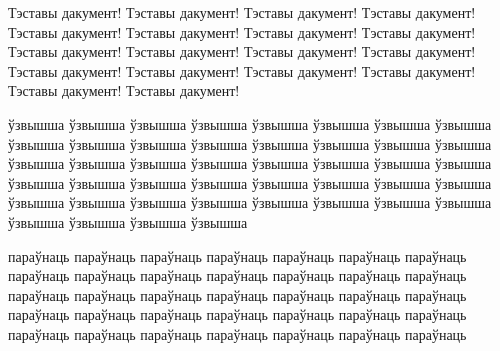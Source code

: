 \documentclass[a4paper]{article}
\begin{document}
Тэставы дакумент! Тэставы дакумент! Тэставы дакумент! Тэставы дакумент! Тэставы дакумент! Тэставы дакумент! Тэставы дакумент! Тэставы дакумент! Тэставы дакумент! Тэставы дакумент! Тэставы дакумент! Тэставы дакумент! Тэставы дакумент! Тэставы дакумент! Тэставы дакумент! Тэставы дакумент! Тэставы дакумент! Тэставы дакумент!

ўзвышша ўзвышша ўзвышша ўзвышша ўзвышша ўзвышша ўзвышша ўзвышша ўзвышша ўзвышша ўзвышша ўзвышша ўзвышша ўзвышша ўзвышша ўзвышша ўзвышша ўзвышша ўзвышша ўзвышша ўзвышша ўзвышша ўзвышша ўзвышша ўзвышша ўзвышша ўзвышша ўзвышша ўзвышша ўзвышша ўзвышша ўзвышша ўзвышша ўзвышша ўзвышша ўзвышша ўзвышша ўзвышша ўзвышша ўзвышша ўзвышша ўзвышша ўзвышша ўзвышша

параўнаць параўнаць параўнаць параўнаць параўнаць параўнаць параўнаць параўнаць параўнаць параўнаць параўнаць параўнаць параўнаць параўнаць параўнаць параўнаць параўнаць параўнаць параўнаць параўнаць параўнаць параўнаць параўнаць параўнаць параўнаць параўнаць параўнаць параўнаць параўнаць параўнаць параўнаць параўнаць параўнаць параўнаць параўнаць
\end{document}
